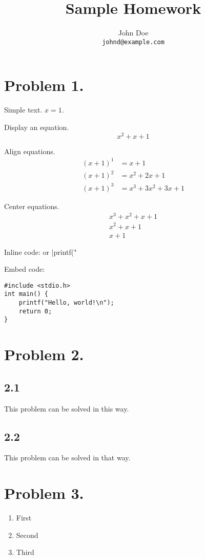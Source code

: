 \documentclass[a4paper,11pt]{article}
\begin{document}
\title{Sample Homework}
\author{John Doe \\ \texttt{johnd@example.com}}
\maketitle

\section*{Problem 1.}

Simple text. $x = 1$.

Display an equation.
\[
  x^2 + x + 1
\]

Align equations.
\begin{align*}
  {(x + 1)}^1 &= x + 1 \\
  {(x + 1)}^2 &= x^2 + 2x + 1 \\
  {(x + 1)}^3 &= x^3 + 3x^2 + 3x + 1
\end{align*}

Center equations.
\begin{gather*}
  x^3 + x^2 + x + 1 \\
  x^2 + x + 1 \\
  x + 1
\end{gather*}

Inline code:  or \code|printf("%

Embed code:
\begin{verbatim}
#include <stdio.h>
int main() {
    printf("Hello, world!\n");
    return 0;
}
\end{verbatim}

\section*{Problem 2.}

\subsection*{2.1}

This problem can be solved in this way.

\subsection*{2.2}

This problem can be solved in that way.

\section*{Problem 3.}

\begin{enumerate}[label=(\alph*)]
  \item First

  \item Second

  \item Third
\end{enumerate}
\end{document}
